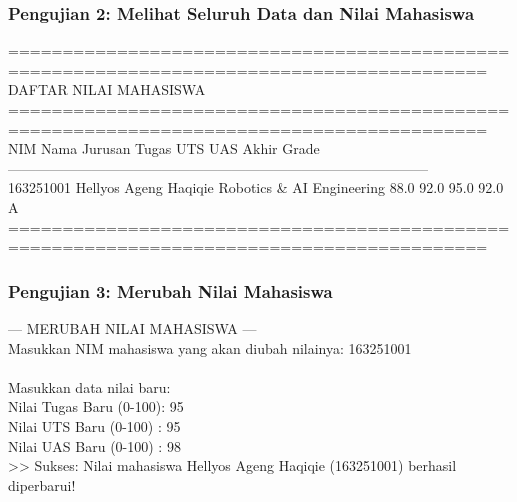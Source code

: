 \documentclass[12pt,a4paper]{article}
\begin{document}
\subsubsection{Pengujian 2: Melihat Seluruh Data dan Nilai Mahasiswa}
\begin{tcolorbox}[colback=black!90!white,coltext=green!90!white,fontupper=\ttfamily\footnotesize,title=\textbf{Terminal Output: Melihat Semua Nilai}]
==========================================================================================\\
                                  DAFTAR NILAI MAHASISWA                                  \\
==========================================================================================\\
NIM           Nama                  Jurusan                        Tugas   UTS   UAS   Akhir  Grade\\
------------------------------------------------------------------------------------------\\
163251001     Hellyos Ageng Haqiqie Robotics \& AI Engineering     88.0   92.0  95.0    92.0      A\\
==========================================================================================
\end{tcolorbox}

\subsubsection{Pengujian 3: Merubah Nilai Mahasiswa}
\begin{tcolorbox}[colback=black!90!white,coltext=green!90!white,fontupper=\ttfamily\footnotesize,title=\textbf{Terminal Output: Merubah Nilai Mahasiswa}]
--- MERUBAH NILAI MAHASISWA ---\\
Masukkan NIM mahasiswa yang akan diubah nilainya: 163251001\\
\\
Masukkan data nilai baru:\\
Nilai Tugas Baru (0-100): 95\\
Nilai UTS Baru (0-100)  : 95\\
Nilai UAS Baru (0-100)  : 98\\
>> Sukses: Nilai mahasiswa Hellyos Ageng Haqiqie (163251001) berhasil diperbarui!
\end{tcolorbox}
\end{document}
